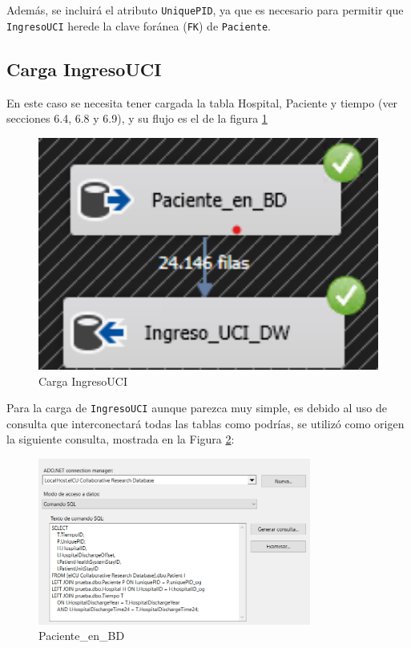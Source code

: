 \documentclass[12pt, a4paper, twoside]{article}
\begin{document}
	
	Además, se incluirá el atributo \texttt{UniquePID}, ya que es necesario para permitir que \texttt{IngresoUCI} herede la clave foránea (\texttt{FK}) de \texttt{Paciente}.
	
	\subsection{Carga IngresoUCI}
	
	En este caso se necesita tener cargada la tabla Hospital, Paciente y tiempo (ver secciones 6.4, 6.8 y 6.9), y su flujo es el de la figura \ref{fig:19}
	
	\begin{figure}[H]
		\centering
		\includegraphics[width=1\textwidth]{image/110_carga_ingreso.png}
		\caption{Carga IngresoUCI}
		\label{fig:19}
	\end{figure}
	
	Para la carga de \texttt{IngresoUCI} aunque parezca muy simple, es debido al uso de consulta que interconectará todas las tablas como podrías, se utilizó como origen la siguiente consulta, mostrada en la Figura \ref{fig:26}:
	
	\begin{figure}[H]
		\centering
		\includegraphics[width=0.8\textwidth]{image/110_carga_ingreso_origen.png}
		\caption{Paciente\_en\_BD}
		\label{fig:26}
	\end{figure}
	
\end{document}
